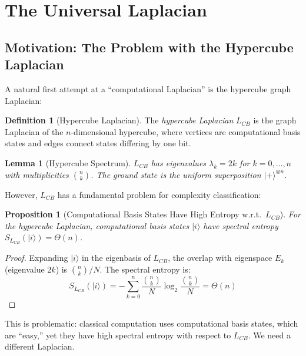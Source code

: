 \documentclass[11pt,a4paper]{article}
\theoremstyle{plain}
\newtheorem{lemma}[theorem]{Lemma}
\newtheorem{proposition}[theorem]{Proposition}
\theoremstyle{definition}
\newtheorem{definition}[theorem]{Definition}
\theoremstyle{remark}
\newcommand{\ket}[1]{|#1\rangle}
\begin{document}
\section{The Universal Laplacian}\label{sec:universal}

\subsection{Motivation: The Problem with the Hypercube Laplacian}

A natural first attempt at a ``computational Laplacian'' is the hypercube graph Laplacian:

\begin{definition}[Hypercube Laplacian]
The \emph{hypercube Laplacian} $L_{CB}$ is the graph Laplacian of the $n$-dimensional hypercube, where vertices are computational basis states and edges connect states differing by one bit.
\end{definition}

\begin{lemma}[Hypercube Spectrum]
$L_{CB}$ has eigenvalues $\lambda_k = 2k$ for $k = 0, \ldots, n$ with multiplicities $\binom{n}{k}$. The ground state is the uniform superposition $\ket{+}^{\otimes n}$.
\end{lemma}

However, $L_{CB}$ has a fundamental problem for complexity classification:

\begin{proposition}[Computational Basis States Have High Entropy w.r.t.\ $L_{CB}$]
For the hypercube Laplacian, computational basis states $\ket{i}$ have spectral entropy $S_{L_{CB}}(\ket{i}) = \Theta(n)$.
\end{proposition}

\begin{proof}
Expanding $\ket{i}$ in the eigenbasis of $L_{CB}$, the overlap with eigenspace $E_k$ (eigenvalue $2k$) is $\binom{n}{k}/N$. The spectral entropy is:
\begin{equation}
    S_{L_{CB}}(\ket{i}) = -\sum_{k=0}^{n} \frac{\binom{n}{k}}{N} \log_2 \frac{\binom{n}{k}}{N} = \Theta(n)
\end{equation}
\end{proof}

This is problematic: classical computation uses computational basis states, which are ``easy,'' yet they have high spectral entropy with respect to $L_{CB}$. We need a different Laplacian.
\end{document}
